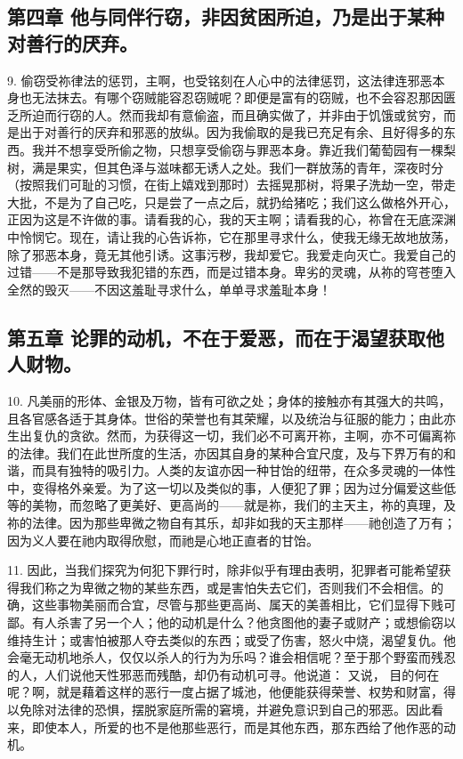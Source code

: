 \subsection{第四章 他与同伴行窃，非因贫困所迫，乃是出于某种对善行的厌弃。}

9. 偷窃受祢律法的惩罚，主啊，也受铭刻在人心中的法律惩罚，这法律连邪恶本身也无法抹去。有哪个窃贼能容忍窃贼呢？即便是富有的窃贼，也不会容忍那因匮乏所迫而行窃的人。然而我却有意偷盗，而且确实做了，并非由于饥饿或贫穷，而是出于对善行的厌弃和邪恶的放纵。因为我偷取的是我已充足有余、且好得多的东西。我并不想享受所偷之物，只想享受偷窃与罪恶本身。靠近我们葡萄园有一棵梨树，满是果实，但其色泽与滋味都无诱人之处。我们一群放荡的青年，深夜时分（按照我们可耻的习惯，在街上嬉戏到那时）去摇晃那树，将果子洗劫一空，带走大批，不是为了自己吃，只是尝了一点之后，就扔给猪吃；我们这么做格外开心，正因为这是不许做的事。请看我的心，我的天主啊；请看我的心，祢曾在无底深渊中怜悯它。现在，请让我的心告诉祢，它在那里寻求什么，使我无缘无故地放荡，除了邪恶本身，竟无其他引诱。这事污秽，我却爱它。我爱走向灭亡。我爱自己的过错——不是那导致我犯错的东西，而是过错本身。卑劣的灵魂，从祢的穹苍堕入全然的毁灭——不因这羞耻寻求什么，单单寻求羞耻本身！\par


\subsection{第五章 论罪的动机，不在于爱恶，而在于渴望获取他人财物。}

10. 凡美丽的形体、金银及万物，皆有可欲之处；身体的接触亦有其强大的共鸣，且各官感各适于其身体。世俗的荣誉也有其荣耀，以及统治与征服的能力；由此亦生出复仇的贪欲。然而，为获得这一切，我们必不可离开祢，主啊，亦不可偏离祢的法律。我们在此世所度的生活，亦因其自身的某种合宜尺度，及与下界万有的和谐，而具有独特的吸引力。人类的友谊亦因一种甘饴的纽带，在众多灵魂的一体性中，变得格外亲爱。为了这一切以及类似的事，人便犯了罪；因为过分偏爱这些低等的美物，而忽略了更美好、更高尚的——就是祢，我们的主天主，祢的真理，及祢的法律。因为那些卑微之物自有其乐，却非如我的天主那样——祂创造了万有；因为义人要在祂内取得欣慰，而祂是心地正直者的甘饴。\par

11. 因此，当我们探究为何犯下罪行时，除非似乎有理由表明，犯罪者可能希望获得我们称之为卑微之物的某些东西，或是害怕失去它们，否则我们不会相信。的确，这些事物美丽而合宜，尽管与那些更高尚、属天的美善相比，它们显得下贱可鄙。有人杀害了另一个人；他的动机是什么？他贪图他的妻子或财产；或想偷窃以维持生计；或害怕被那人夺去类似的东西；或受了伤害，怒火中烧，渴望复仇。他会毫无动机地杀人，仅仅以杀人的行为为乐吗？谁会相信呢？至于那个野蛮而残忍的人，人们说他天性邪恶而残酷，却仍有动机可寻。他说道： 又说， 目的何在呢？啊，就是藉着这样的恶行一度占据了城池，他便能获得荣誉、权势和财富，得以免除对法律的恐惧，摆脱家庭所需的窘境，并避免意识到自己的邪恶。因此看来，即使本人，所爱的也不是他那些恶行，而是其他东西，那东西给了他作恶的动机。\par


